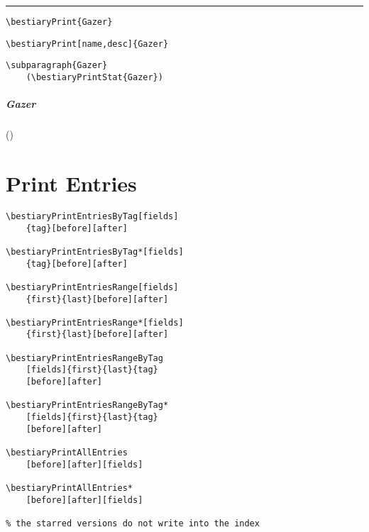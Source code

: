 \documentclass[itdr]{subfiles}
\begin{document}
\skipline
\hrule
\vfill

\begin{lstlisting}
\bestiaryPrint{Gazer}
\end{lstlisting}


\vfill

\begin{lstlisting}
\bestiaryPrint[name,desc]{Gazer}
\end{lstlisting}


\vfill

\begin{lstlisting}
\subparagraph{Gazer}
	(\bestiaryPrintStat{Gazer})
\end{lstlisting}

\subparagraph{Gazer} ()

\vfill
\break

\section{Print Entries}

\begin{lstlisting}
\bestiaryPrintEntriesByTag[fields]
	{tag}[before][after]

\bestiaryPrintEntriesByTag*[fields]
	{tag}[before][after]

\bestiaryPrintEntriesRange[fields]
	{first}{last}[before][after]

\bestiaryPrintEntriesRange*[fields]
	{first}{last}[before][after]

\bestiaryPrintEntriesRangeByTag
	[fields]{first}{last}{tag}
	[before][after]

\bestiaryPrintEntriesRangeByTag*
	[fields]{first}{last}{tag}
	[before][after]

\bestiaryPrintAllEntries
	[before][after][fields]

\bestiaryPrintAllEntries*
	[before][after][fields]

% the starred versions do not write into the index
\end{lstlisting}

\begin{comment}
\subsection{By Tag (monster)}

\begin{lstlisting}
\bestiaryPrintEntriesByTag{monster}
	[][\vfill]
\end{lstlisting}

\bestiaryPrintEntriesByTag{monster}[][\vfill]
\end{comment}
\end{document}
